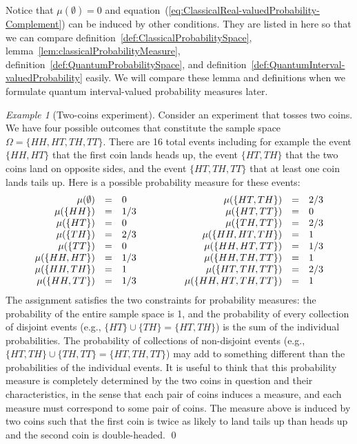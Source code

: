 \documentclass{article}
\theoremstyle{remark}
\newtheorem{example}{Example}
\newcommand{\pmeas}{\ensuremath{\mu}}
\begin{document}
Notice that $\pmeas(\emptyset)=0$ and equation~(\ref{eq:ClassicalReal-valuedProbability-Complement})
can be induced by other conditions. They are listed in here so that
we can compare definition~\ref{def:ClassicalProbabilitySpace}, lemma~\ref{lem:classicalProbabilityMeasure},
definition~\ref{def:QuantumProbabilitySpace}, and definition~\ref{def:QuantumInterval-valuedProbability}
easily. We will compare these lemma and definitions when we formulate
quantum interval-valued probability measures later.

\begin{example}[Two-coins experiment]\label{ex1} Consider an
experiment that tosses two coins. We have four possible outcomes that
constitute the sample space $\Omega=\{HH,HT,TH,TT\}$. There are 16
total events including for example the event $\{HH,HT\}$ that the
first coin lands heads up, the event $\{HT,TH\}$ that the two coins
land on opposite sides, and the event $\{HT,TH,TT\}$ that at least
one coin lands tails up. Here is a possible probability measure for
these events: 
\[
\begin{array}{c@{\qquad\qquad}c}
\begin{array}{rcl}
\pmeas(\emptyset) & = & 0\\
\pmeas(\{HH\}) & = & 1/3\\
\pmeas(\{HT\}) & = & 0\\
\pmeas(\{TH\}) & = & 2/3\\
\pmeas(\{TT\}) & = & 0\\
\pmeas(\{HH,HT\}) & = & 1/3\\
\pmeas(\{HH,TH\}) & = & 1\\
\pmeas(\{HH,TT\}) & = & 1/3
\end{array} & \begin{array}{rcl}
\pmeas(\{HT,TH\}) & = & 2/3\\
\pmeas(\{HT,TT\}) & = & 0\\
\pmeas(\{TH,TT\}) & = & 2/3\\
\pmeas(\{HH,HT,TH\}) & = & 1\\
\pmeas(\{HH,HT,TT\}) & = & 1/3\\
\pmeas(\{HH,TH,TT\}) & = & 1\\
\pmeas(\{HT,TH,TT\}) & = & 2/3\\
\pmeas(\{HH,HT,TH,TT\}) & = & 1
\end{array}\end{array}
\]
The assignment satisfies the two constraints for probability measures:
the probability of the entire sample space is 1, and the probability
of every collection of disjoint events (e.g., $\{HT\}\cup\{TH\}=\{HT,TH\}$)
is the sum of the individual probabilities. The probability of collections
of non-disjoint events (e.g., $\{HT,TH\}\cup\{TH,TT\}=\{HT,TH,TT\}$)
may add to something different than the probabilities of the individual
events. It is useful to think that this probability measure is completely
determined by the two coins in question and their characteristics,
in the sense that each pair of coins induces a measure, and each measure
must correspond to some pair of coins. The measure above is induced
by two coins such that the first coin is twice as likely to land tails
up than heads up and the second coin is double-headed. \qed\end{example}
\end{document}
